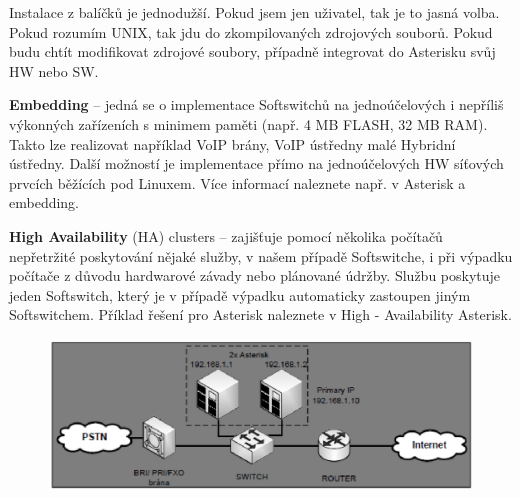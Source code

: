 Instalace z balíčků je jednodužší. Pokud jsem jen uživatel, tak je to jasná volba.
Pokud rozumím UNIX, tak jdu do zkompilovaných zdrojových souborů. Pokud budu chtít modifikovat zdrojové soubory, případně integrovat do Asterisku svůj HW nebo SW.


\textbf{Embedding} -- jedná se o implementace Softswitchů na jednoúčelových i nepříliš výkonných zařízeních s minimem paměti (např. 4 MB FLASH, 32 MB RAM). Takto lze realizovat například VoIP brány, VoIP ústředny malé Hybridní ústředny. Další možností je implementace přímo na jednoúčelových HW síťových prvcích běžících pod Linuxem. Více informací naleznete např. v Asterisk a embedding.

\textbf{High Availability} (HA) clusters -- zajišťuje pomocí několika počítačů nepřetržité poskytování nějaké služby, v našem případě Softswitche, i při výpadku počítače z důvodu hardwarové závady nebo plánované údržby. Službu poskytuje jeden Softswitch, který je v případě výpadku automaticky zastoupen jiným Softswitchem. Příklad řešení pro Asterisk naleznete v High - Availability Asterisk.

\begin{figure}[h!]
    \begin{center}
        \includegraphics[width=\textwidth]{images/otazka11.png}
        \label{img:5}
    \end{center}
\end{figure}

